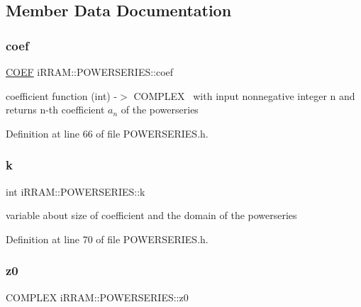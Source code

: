 \subsection{Member Data Documentation}
\mbox{\label{classi_r_r_a_m_1_1_p_o_w_e_r_s_e_r_i_e_s_a4a9d45aaad4a616c78c2cb9cf83942bc}} 
\subsubsection{\texorpdfstring{coef}{coef}}
{\footnotesize\ttfamily \mbox{\hyperlink{namespacei_r_r_a_m_a7fb438d61c85aface41ae108812df36f}{C\+O\+EF}} i\+R\+R\+A\+M\+::\+P\+O\+W\+E\+R\+S\+E\+R\+I\+E\+S\+::coef\hspace{0.3cm}{\ttfamily [private]}}

coefficient function (int) -\/$>$ C\+O\+M\+P\+L\+EX~\newline
with input nonnegative integer n and returns n-\/th coefficient $a_n$ of the powerseries 

Definition at line 66 of file P\+O\+W\+E\+R\+S\+E\+R\+I\+E\+S.\+h.

\mbox{\label{classi_r_r_a_m_1_1_p_o_w_e_r_s_e_r_i_e_s_aefb307111078169532e8a0b16507469a}} 
\subsubsection{\texorpdfstring{k}{k}}
{\footnotesize\ttfamily int i\+R\+R\+A\+M\+::\+P\+O\+W\+E\+R\+S\+E\+R\+I\+E\+S\+::k\hspace{0.3cm}{\ttfamily [private]}}

variable about size of coefficient and the domain of the powerseries 

Definition at line 70 of file P\+O\+W\+E\+R\+S\+E\+R\+I\+E\+S.\+h.

\mbox{\label{classi_r_r_a_m_1_1_p_o_w_e_r_s_e_r_i_e_s_a9ce9c509d0376f35f6c6b5d876d6683f}} 
\subsubsection{\texorpdfstring{z0}{z0}}
{\footnotesize\ttfamily C\+O\+M\+P\+L\+EX i\+R\+R\+A\+M\+::\+P\+O\+W\+E\+R\+S\+E\+R\+I\+E\+S\+::z0\hspace{0.3cm}{\ttfamily [private]}}

